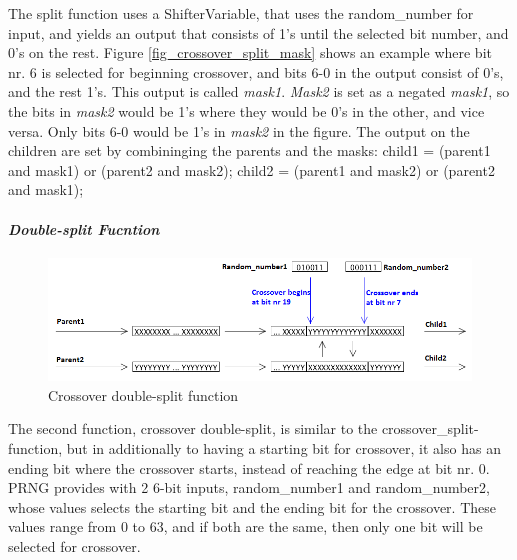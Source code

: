 The split function uses a ShifterVariable, that uses the random\_number for input, and yields an output that consists of 1's until the selected bit number, and 0's on the rest.
Figure \ref{fig_crossover_split_mask} shows an example where bit nr.
6 is selected for beginning crossover, and bits 6-0 in the output consist of 0's, and the rest 1's.
This output is called \emph{mask1}.
\emph{Mask2} is set as a negated \emph{mask1}, so the bits in \emph{mask2} would be 1's where they would be 0's in the other, and vice versa.
Only bits 6-0 would be 1's in \emph{mask2} in the figure.
The output on the children are set by combininging the parents and the masks:
\linebreak child1 \<= (parent1 and mask1) or (parent2 and mask2);
\linebreak child2 \<= (parent1 and mask2) or (parent2 and mask1);


\paragraph{\textit{Double-split Fucntion}}
\begin{figure}[H]
\includegraphics[width=\textwidth]{fpga/fig/crossover_doublesplit.png}
\caption{Crossover double-split function}
\label{fig_crossover_doublesplit}
\end{figure}

The second function, crossover double-split, is similar to the crossover\_split-function, but in additionally to having a starting bit for crossover, it also has an ending bit where the crossover starts, instead of reaching the edge at bit nr.
0.
PRNG provides with 2 6-bit inputs, random\_number1 and random\_number2, whose values selects the starting bit and the ending bit for the crossover.
These values range from 0 to 63, and if both are the same, then only one bit will be selected for crossover.

